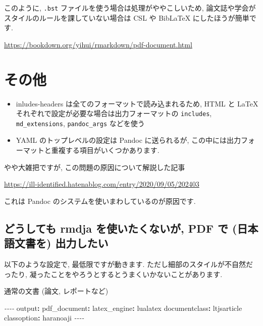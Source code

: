 \documentclass[
]{bxjsarticle}
\newenvironment{Shaded}{\begin{snugshade}}{\end{snugshade}}
\newcommand{\AttributeTok}[1]{\textcolor[rgb]{0.77,0.63,0.00}{#1}}
\newcommand{\FunctionTok}[1]{\textcolor[rgb]{0.00,0.00,0.00}{#1}}
\newcommand{\KeywordTok}[1]{\textcolor[rgb]{0.13,0.29,0.53}{\textbf{#1}}}
\newcommand{\PreprocessorTok}[1]{\textcolor[rgb]{0.56,0.35,0.01}{\textit{#1}}}
\providecommand{\tightlist}{%
  \setlength{\itemsep}{0pt}\setlength{\parskip}{0pt}}
\begin{document}
このように, \texttt{.bst} ファイルを使う場合は処理がややこしいため, 論文誌や学会がスタイルのルールを課していない場合は CSL や BibLaTeX にしたほうが簡単です.

\url{https://bookdown.org/yihui/rmarkdown/pdf-document.html}

\hypertarget{ux305dux306eux4ed6}{%
\section{その他}\label{ux305dux306eux4ed6}}

\begin{itemize}
\tightlist
\item
  inludes-headers は全てのフォーマットで読み込まれるため, HTML と LaTeX それぞれで設定が必要な場合は出力フォーマットの \texttt{includes}, \texttt{md\_extensions}, \texttt{pandoc\_args} などを使う
\item
  YAML のトップレベルの設定は Pandoc に送られるが, この中には出力フォーマットと重複する項目がいくつかあります.
\end{itemize}

やや大雑把ですが, この問題の原因について解説した記事

\url{https://ill-identified.hatenablog.com/entry/2020/09/05/202403}

これは Pandoc のシステムを使いまわしているのが原因です.

\hypertarget{ux3069ux3046ux3057ux3066ux3082-rmdja-ux3092ux4f7fux3044ux305fux304fux306aux3044ux304c-pdf-ux3067-ux65e5ux672cux8a9eux6587ux66f8ux3092-ux51faux529bux3057ux305fux3044}{%
\subsection{\texorpdfstring{どうしても \textbf{rmdja} を使いたくないが, PDF で (日本語文書を) 出力したい}{どうしても rmdja を使いたくないが, PDF で (日本語文書を) 出力したい}}\label{ux3069ux3046ux3057ux3066ux3082-rmdja-ux3092ux4f7fux3044ux305fux304fux306aux3044ux304c-pdf-ux3067-ux65e5ux672cux8a9eux6587ux66f8ux3092-ux51faux529bux3057ux305fux3044}}

以下のような設定で, 最低限ですが動きます. ただし細部のスタイルが不自然だったり, 凝ったことをやろうとするとうまくいかないことがあります.

通常の文書 (論文, レポートなど)

\begin{Shaded}
\begin{Highlighting}[numbers=left,,]
\PreprocessorTok{{-}{-}{-}{-}}
\FunctionTok{output}\KeywordTok{:}
\AttributeTok{  }\FunctionTok{pdf\_document}\KeywordTok{:}
\AttributeTok{    }\FunctionTok{latex\_engine}\KeywordTok{:}\AttributeTok{ lualatex}
\FunctionTok{documentclass}\KeywordTok{:}\AttributeTok{ ltjsarticle}
\FunctionTok{classoption}\KeywordTok{:}\AttributeTok{ haranoaji}
\PreprocessorTok{{-}{-}{-}{-}}
\end{Highlighting}
\end{Shaded}
\end{document}
